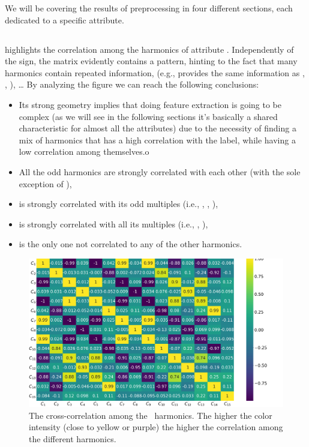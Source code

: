 We will be covering the results of preprocessing in four different sections, each dedicated to a
specific attribute.

\subsection{\an}
\label{sec:an}
 highlights the correlation among the harmonics of attribute \an. Independently of
the sign, the matrix evidently contains a pattern, hinting to the fact that many harmonics contain
repeated information, (e.g., \an[1] provides the same information as \an[3], \an[5], \an[7]), \ldots
By analyzing the figure we can reach the following conclusions:
\begin{itemize}
	\item Its strong geometry implies that doing feature extraction is going to be complex (as
	      we will see in the following sections it's basically a shared characteristic for
	      almost all the attributes) due to the necessity of finding a mix of harmonics that
	      has a high correlation with the label, while having a low correlation among
	      themselves.o
	\item All the odd harmonics are strongly correlated with each other (with the sole exception
	      of \an[15]),
	\item \an[2] is strongly correlated with its odd multiples (i.e., \an[6], \an[10], \an[14]),
	\item \an[4] is strongly correlated with all its multiples (i.e., \an[8], \an[12]),
	\item \an[15] is the only one not correlated to any of the other harmonics.
\end{itemize}
\begin{figure}[!ht]
	\centering
	\includegraphics[width=\linewidth]{img/An_corr_matrix.png}
	\caption{The cross-correlation among the \an\ harmonics. The higher the color intensity
		(close to yellow or purple) the higher the correlation among the different harmonics.} \label{fig:an-corr}
\end{figure}

